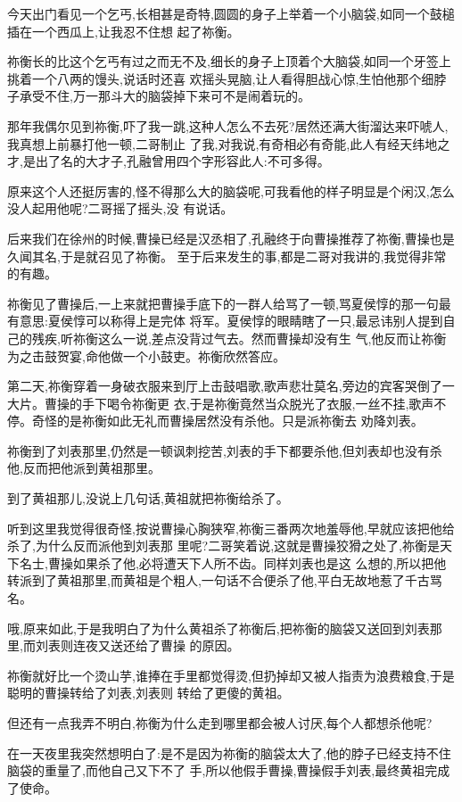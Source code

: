 ﻿\documentclass[12pt,twocolumn]{article}
\begin{document}
今天出门看见一个乞丐,长相甚是奇特,圆圆的身子上举着一个小脑袋,如同一个鼓槌插在一个西瓜上,让我忍不住想
起了祢衡。

祢衡长的比这个乞丐有过之而无不及,细长的身子上顶着个大脑袋,如同一个牙签上挑着一个八两的馒头,说话时还喜
欢摇头晃脑,让人看得胆战心惊,生怕他那个细脖子承受不住,万一那斗大的脑袋掉下来可不是闹着玩的。

那年我偶尔见到祢衡,吓了我一跳,这种人怎么不去死?居然还满大街溜达来吓唬人,我真想上前暴打他一顿,二哥制止
了我,对我说,有奇相必有奇能,此人有经天纬地之才,是出了名的大才子,孔融曾用四个字形容此人:不可多得。

原来这个人还挺厉害的,怪不得那么大的脑袋呢,可我看他的样子明显是个闲汉,怎么没人起用他呢?二哥摇了摇头,没
有说话。

后来我们在徐州的时候,曹操已经是汉丞相了,孔融终于向曹操推荐了祢衡,曹操也是久闻其名,于是就召见了祢衡。
至于后来发生的事,都是二哥对我讲的,我觉得非常的有趣。

祢衡见了曹操后,一上来就把曹操手底下的一群人给骂了一顿,骂夏侯惇的那一句最有意思:夏侯惇可以称得上是完体
将军。夏侯惇的眼睛瞎了一只,最忌讳别人提到自己的残疾,听祢衡这么一说,差点没背过气去。然而曹操却没有生
气,他反而让祢衡为之击鼓贺宴,命他做一个小鼓吏。祢衡欣然答应。

第二天,祢衡穿着一身破衣服来到厅上击鼓唱歌,歌声悲壮莫名,旁边的宾客哭倒了一大片。曹操的手下喝令祢衡更
衣,于是祢衡竟然当众脱光了衣服,一丝不挂,歌声不停。奇怪的是祢衡如此无礼而曹操居然没有杀他。只是派祢衡去
劝降刘表。

祢衡到了刘表那里,仍然是一顿讽刺挖苦,刘表的手下都要杀他,但刘表却也没有杀他,反而把他派到黄祖那里。

到了黄祖那儿,没说上几句话,黄祖就把祢衡给杀了。

听到这里我觉得很奇怪,按说曹操心胸狭窄,祢衡三番两次地羞辱他,早就应该把他给杀了,为什么反而派他到刘表那
里呢?二哥笑着说,这就是曹操狡猾之处了,祢衡是天下名士,曹操如果杀了他,必将遭天下人所不齿。同样刘表也是这
么想的,所以把他转派到了黄祖那里,而黄祖是个粗人,一句话不合便杀了他,平白无故地惹了千古骂名。

哦,原来如此,于是我明白了为什么黄祖杀了祢衡后,把祢衡的脑袋又送回到刘表那里,而刘表则连夜又送还给了曹操
的原因。

祢衡就好比一个烫山芋,谁捧在手里都觉得烫,但扔掉却又被人指责为浪费粮食,于是聪明的曹操转给了刘表,刘表则
转给了更傻的黄祖。

但还有一点我弄不明白,祢衡为什么走到哪里都会被人讨厌,每个人都想杀他呢?

在一天夜里我突然想明白了:是不是因为祢衡的脑袋太大了,他的脖子已经支持不住脑袋的重量了,而他自己又下不了
手,所以他假手曹操,曹操假手刘表,最终黄祖完成了使命。
\end{document}
